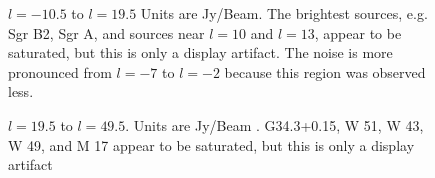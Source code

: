 \documentclass[12pt,preprint]{aastex}
\begin{document}
%
%


\setcounter{subfig}{1}
\renewcommand{\thefigure}{\arabic{figure}\alph{subfig}}

\begin{figure}
  \begin{minipage}{6.5in}
    \begin{center}
      \caption{$l=-10.5$ to $l=19.5$ Units are Jy/Beam.  The brightest
	sources, e.g. Sgr B2, Sgr A, and sources near $l=10$ and
	$l=13$, appear to be saturated, but this is only a display
	artifact.  The noise is more pronounced from $l=-7$ to $l=-2$
	because this region was observed less.}
    \end{center}
    \label{fig:BGPSMontage}
  \end{minipage}
\end{figure}
  
\addtocounter{figure}{-1}
\addtocounter{subfig}{1}

\begin{figure}
  \begin{minipage}{6.5in} 
    \begin{center}
      \caption{$l=19.5$ to $l=49.5$.  Units are Jy/Beam .  G34.3+0.15, W
	51, W 43, W 49, and M 17 appear to be saturated, but this is
	only a display artifact}
    \end{center}
  \end{minipage}
\end{figure}

\addtocounter{figure}{-1}
\addtocounter{subfig}{1}
\end{document}
